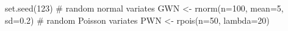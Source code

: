 \begin{Schunk}
\begin{Sinput}
 set.seed(123)
 # random normal variates
 GWN <- rnorm(n=100, mean=5, sd=0.2)
 # random Poisson variates
 PWN <- rpois(n=50, lambda=20)
\end{Sinput}
\end{Schunk}
